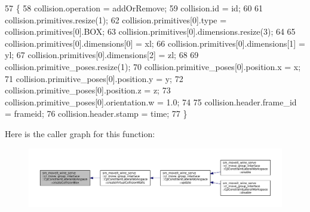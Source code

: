 \begin{DoxyCode}
57         \{
58             collision.operation = addOrRemove;
59             collision.id = id;
60 
61             collision.primitives.resize(1);
62             collision.primitives[0].type = collision.primitives[0].BOX;
63             collision.primitives[0].dimensions.resize(3);
64 
65             collision.primitives[0].dimensions[0] = xl;
66             collision.primitives[0].dimensions[1] = yl;
67             collision.primitives[0].dimensions[2] = zl;
68 
69             collision.primitive\_poses.resize(1);
70             collision.primitive\_poses[0].position.x = x;
71             collision.primitive\_poses[0].position.y = y;
72             collision.primitive\_poses[0].position.z = z;
73             collision.primitive\_poses[0].orientation.w = 1.0;
74 
75             collision.header.frame\_id = frameid;
76             collision.header.stamp = time;
77         \}
\end{DoxyCode}
Here is the caller graph for this function\+:
\nopagebreak
\begin{figure}[H]
\begin{center}
\leavevmode
\includegraphics[width=350pt]{classsm__moveit__wine__serve_1_1cl__move__group__interface_1_1CpConstraintLateralWorkspace_aaf957d5bea4855b8a7328479d971e5d1_icgraph}
\end{center}
\end{figure}
\mbox{\label{classsm__moveit__wine__serve_1_1cl__move__group__interface_1_1CpConstraintLateralWorkspace_aeedef6f788c390a37d6b74d90873f547}} 
